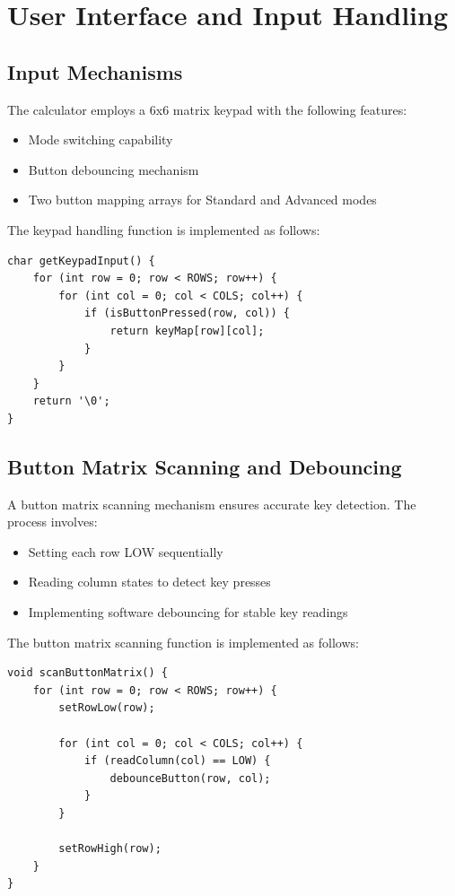 \documentclass[journal]{IEEEtran}
\numberwithin{equation}{enumi}
\numberwithin{figure}{enumi}
\begin{document}
\section{User Interface and Input Handling}

\subsection{Input Mechanisms}

The calculator employs a 6x6 matrix keypad with the following features:

\begin{itemize}
    \item Mode switching capability
    \item Button debouncing mechanism
    \item Two button mapping arrays for Standard and Advanced modes
\end{itemize}

The keypad handling function is implemented as follows:

\begin{lstlisting}[caption=Keypad Input Handling, label=lst:keypad]
char getKeypadInput() {
    for (int row = 0; row < ROWS; row++) {
        for (int col = 0; col < COLS; col++) {
            if (isButtonPressed(row, col)) {
                return keyMap[row][col];
            }
        }
    }
    return '\0';
}
\end{lstlisting}

\subsection{Button Matrix Scanning and Debouncing}

A button matrix scanning mechanism ensures accurate key detection. The process involves:

\begin{itemize}
    \item Setting each row LOW sequentially
    \item Reading column states to detect key presses
    \item Implementing software debouncing for stable key readings
\end{itemize}

The button matrix scanning function is implemented as follows:

\begin{lstlisting}[caption=Button Matrix Scanning, label=lst:buttonmatrix]
void scanButtonMatrix() {
    for (int row = 0; row < ROWS; row++) {
        setRowLow(row);
        
        for (int col = 0; col < COLS; col++) {
            if (readColumn(col) == LOW) {
                debounceButton(row, col);
            }
        }
        
        setRowHigh(row);
    }
}
\end{lstlisting}
\end{document}
